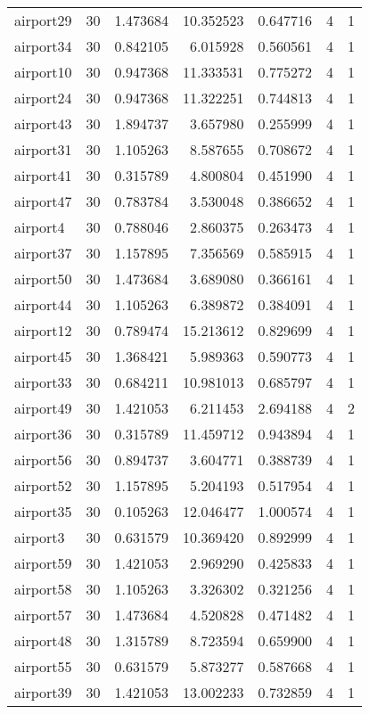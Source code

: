 \begin{longtable}{|l|r|r|r|r|r|r|}
airport29 & 30 & 1.473684 & 10.352523 & 0.647716 & 4 & 1 \\
airport34 & 30 & 0.842105 & 6.015928 & 0.560561 & 4 & 1 \\
airport10 & 30 & 0.947368 & 11.333531 & 0.775272 & 4 & 1 \\
airport24 & 30 & 0.947368 & 11.322251 & 0.744813 & 4 & 1 \\
airport43 & 30 & 1.894737 & 3.657980 & 0.255999 & 4 & 1 \\
airport31 & 30 & 1.105263 & 8.587655 & 0.708672 & 4 & 1 \\
airport41 & 30 & 0.315789 & 4.800804 & 0.451990 & 4 & 1 \\
airport47 & 30 & 0.783784 & 3.530048 & 0.386652 & 4 & 1 \\
airport4 & 30 & 0.788046 & 2.860375 & 0.263473 & 4 & 1 \\
airport37 & 30 & 1.157895 & 7.356569 & 0.585915 & 4 & 1 \\
airport50 & 30 & 1.473684 & 3.689080 & 0.366161 & 4 & 1 \\
airport44 & 30 & 1.105263 & 6.389872 & 0.384091 & 4 & 1 \\
airport12 & 30 & 0.789474 & 15.213612 & 0.829699 & 4 & 1 \\
airport45 & 30 & 1.368421 & 5.989363 & 0.590773 & 4 & 1 \\
airport33 & 30 & 0.684211 & 10.981013 & 0.685797 & 4 & 1 \\
airport49 & 30 & 1.421053 & 6.211453 & 2.694188 & 4 & 2 \\
airport36 & 30 & 0.315789 & 11.459712 & 0.943894 & 4 & 1 \\
airport56 & 30 & 0.894737 & 3.604771 & 0.388739 & 4 & 1 \\
airport52 & 30 & 1.157895 & 5.204193 & 0.517954 & 4 & 1 \\
airport35 & 30 & 0.105263 & 12.046477 & 1.000574 & 4 & 1 \\
airport3 & 30 & 0.631579 & 10.369420 & 0.892999 & 4 & 1 \\
airport59 & 30 & 1.421053 & 2.969290 & 0.425833 & 4 & 1 \\
airport58 & 30 & 1.105263 & 3.326302 & 0.321256 & 4 & 1 \\
airport57 & 30 & 1.473684 & 4.520828 & 0.471482 & 4 & 1 \\
airport48 & 30 & 1.315789 & 8.723594 & 0.659900 & 4 & 1 \\
airport55 & 30 & 0.631579 & 5.873277 & 0.587668 & 4 & 1 \\
airport39 & 30 & 1.421053 & 13.002233 & 0.732859 & 4 & 1 \\

\end{longtable}

